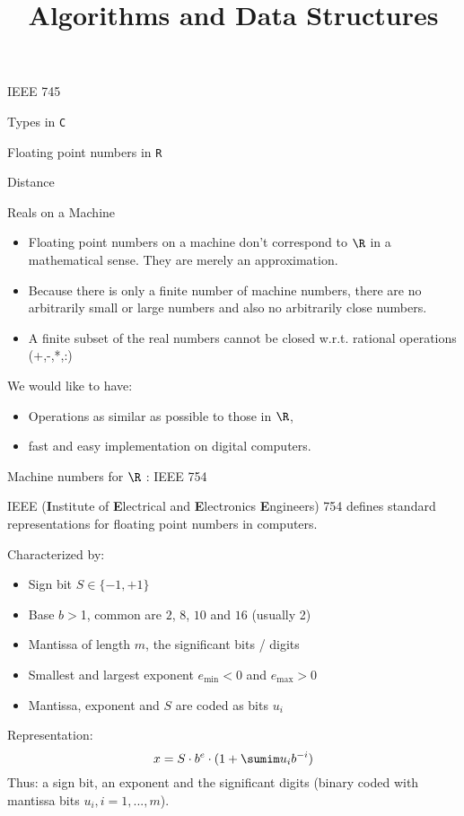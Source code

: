 \documentclass[11pt,compress,t,notes=noshow, xcolor=table]{beamer}
\title{Algorithms and Data Structures}
\begin{document}
{
  \item IEEE 745
  \item Types in \texttt{C}
  \item Floating point numbers in \texttt{R}
  \item Distance
}




\begin{vbframe}{Reals on a Machine}
\begin{itemize}
\item Floating point numbers on a machine don't correspond to $\R$ in a mathematical sense.
  They are merely an approximation.
\item Because there is only a finite number of machine numbers,
  there are no arbitrarily small or large numbers and also no arbitrarily close numbers.
\item A finite subset of the real numbers cannot be closed w.r.t. rational operations (+,-,*,:) %
\end{itemize}

\lz

We would like to have:
\begin{itemize}
  \item Operations as similar as possible to those in $\R$,
  \item fast and easy implementation on digital computers.
\end{itemize}
\end{vbframe}


\begin{vbframe}{Machine numbers for $\R$ : IEEE 754}

IEEE (\textbf{I}nstitute of \textbf{E}lectrical and \textbf{E}lectronics \textbf{E}ngineers) 754 defines standard representations for floating point numbers in computers.

\lz

Characterized by:
\begin{itemize}
\item Sign bit $S\in\{-1, +1\}$
\item Base $b>$1, common are $2$, $8$, $10$ and $16$ (usually 2)
\item Mantissa of length $m$, the significant bits / digits
\item Smallest and largest exponent $e_{\min}<0$ and $e_{\max}>0$
\item Mantissa, exponent and $S$ are coded as bits $u_i$
\end{itemize}

\lz

Representation:
$$
x = S \cdot b^e \cdot (1 + \sumim u_{i} b^{-i}) %
$$
Thus: a sign bit, an exponent and the significant digits (binary coded with mantissa bits $u_i, i = 1,..., m$).
\end{vbframe}
\end{document}
